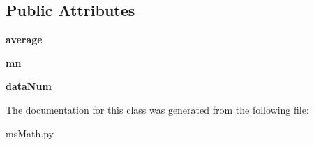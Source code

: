 \subsection*{Public Attributes}
\begin{DoxyCompactItemize}
\item 
{\bfseries average}\hypertarget{classmsMath_1_1onlineStandardDeviations_a536006417b4620f934f6297f3ef19be5}{}\label{classmsMath_1_1onlineStandardDeviations_a536006417b4620f934f6297f3ef19be5}

\item 
{\bfseries mn}\hypertarget{classmsMath_1_1onlineStandardDeviations_a90e0aa23587900677755e52e99147bac}{}\label{classmsMath_1_1onlineStandardDeviations_a90e0aa23587900677755e52e99147bac}

\item 
{\bfseries data\+Num}\hypertarget{classmsMath_1_1onlineStandardDeviations_aaa8088f76ceb012c28e33973c2d532ec}{}\label{classmsMath_1_1onlineStandardDeviations_aaa8088f76ceb012c28e33973c2d532ec}

\end{DoxyCompactItemize}


The documentation for this class was generated from the following file\+:\begin{DoxyCompactItemize}
\item 
ms\+Math.\+py\end{DoxyCompactItemize}

